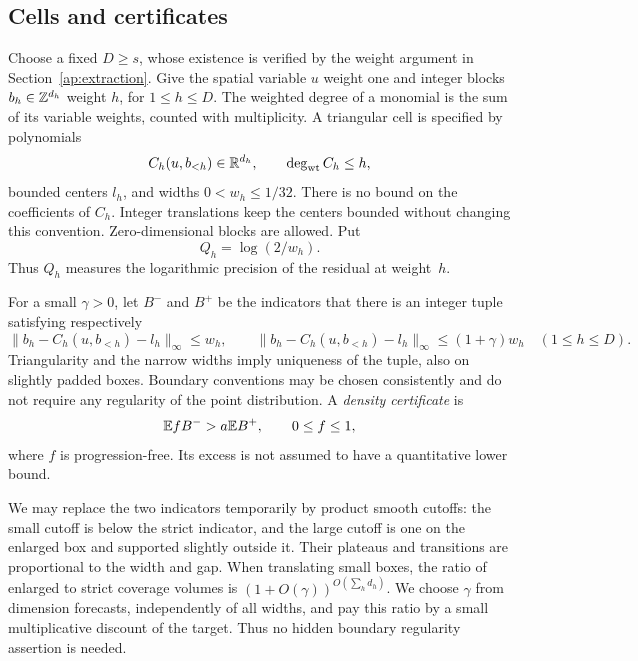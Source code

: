 \subsection{Cells and certificates}

Choose a fixed $D\ge s$, whose existence is verified by the weight
argument in Section~\ref{ap:extraction}. Give the spatial variable
$u$ weight one and integer blocks $b_h\in\mathbb Z^{d_h}$ weight $h$,
for $1\le h\le D$. The weighted degree of a monomial is the sum
of its variable weights, counted with multiplicity. A triangular cell
is specified by polynomials
\[
 C_h(u,b_{<h})\in\mathbb R^{d_h},\qquad \deg_{\rm wt}C_h\le h,
\]
bounded centers $l_h$, and widths $0<w_h\le1/32$. There is no
bound on the coefficients of $C_h$. Integer translations keep the
centers bounded without changing this convention. Zero-dimensional
blocks are allowed. Put
\[
                         Q_h=\log(2/w_h).
\]
Thus $Q_h$ measures the logarithmic precision of the residual at weight~$h$.

For a small $\gamma>0$, let $B^-$ and $B^+$ be the indicators that
there is an integer tuple satisfying respectively
\begin{equation}\label{ap:cell-boxes}
 \|b_h-C_h(u,b_{<h})-l_h\|_\infty\le w_h,
 \qquad
 \|b_h-C_h(u,b_{<h})-l_h\|_\infty\le(1+\gamma)w_h
 \quad(1\le h\le D).
\end{equation}
Triangularity and the narrow widths imply uniqueness of the tuple,
also on slightly padded boxes. Boundary conventions may be chosen
consistently and do not require any regularity of the point
distribution. A \emph{density certificate} is
\begin{equation}\label{ap:certificate}
                 \mathbb E fB^- > a\mathbb E B^+,
 \qquad 0\le f\le1,
\end{equation}
where $f$ is progression-free. Its excess is not assumed to have a
quantitative lower bound.

We may replace the two indicators temporarily by product smooth
cutoffs: the small cutoff is below the strict indicator, and the
large cutoff is one on the enlarged box and supported slightly
outside it. Their plateaus and transitions are proportional to the
width and gap. When translating small boxes, the ratio of enlarged
to strict coverage volumes is $(1+O(\gamma))^{O(\sum_h d_h)}$.
We choose $\gamma$ from dimension forecasts, independently of all
widths, and pay this ratio by a small multiplicative discount of
the target. Thus no hidden boundary regularity assertion is needed.

